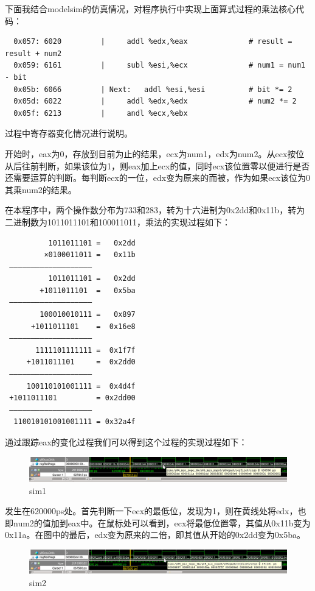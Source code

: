 下面我结合modelsim的仿真情况，对程序执行中实现上面算式过程的乘法核心代码：

\begin{verbatim}
  0x057: 6020         |     addl %edx,%eax              # result = result + num2
  0x059: 6161         |     subl %esi,%ecx              # num1 = num1 - bit
  0x05b: 6066         | Next:   addl %esi,%esi          # bit *= 2
  0x05d: 6022         |     addl %edx,%edx              # num2 *= 2
  0x05f: 6213         |     andl %ecx,%ebx
\end{verbatim}

过程中寄存器变化情况进行说明。

开始时，eax为0，存放到目前为止的结果，ecx为num1，edx为num2。从ecx按位从后往前判断，如果该位为1，则eax加上ecx的值，同时ecx该位置零以便进行是否还需要运算的判断。每判断ecx的一位，edx变为原来的而被，作为如果ecx该位为0其乘num2的结果。

在本程序中，两个操作数分布为733和283，转为十六进制为0x2dd和0x11b，转为二进制数为1011011101和100011011，乘法的实现过程如下：

\begin{verbatim}
          1011011101 =   0x2dd
         ×0100011011 =   0x11b
 ———————————————————
          1011011101 =   0x2dd
        +1011011101  =   0x5ba
 ———————————————————
        100010010111 =   0x897
      +1011011101    =  0x16e8
 ———————————————————
       1111101111111 =  0x1f7f
     +1011011101     =  0x2dd0
 ———————————————————
     100110101001111 =  0x4d4f
 +1011011101         = 0x2dd00
 ———————————————————
  110010101001001111 = 0x32a4f
\end{verbatim}

通过跟踪eax的变化过程我们可以得到这个过程的实现过程如下：

\begin{figure}[htbp]
\centering
\includegraphics{img/sim1.png}
\caption{sim1}
\end{figure}

发生在620000ps处。首先判断一下ecx的最低位，发现为1，则在黄线处将edx，也即num2的值加到eax中。在鼠标处可以看到，ecx将最低位置零，其值从0x11b变为0x11a。在图中的最后，edx变为原来的二倍，即其值从开始的0x2dd变为0x5ba。

\begin{figure}[htbp]
\centering
\includegraphics{img/sim2.png}
\caption{sim2}
\end{figure}

